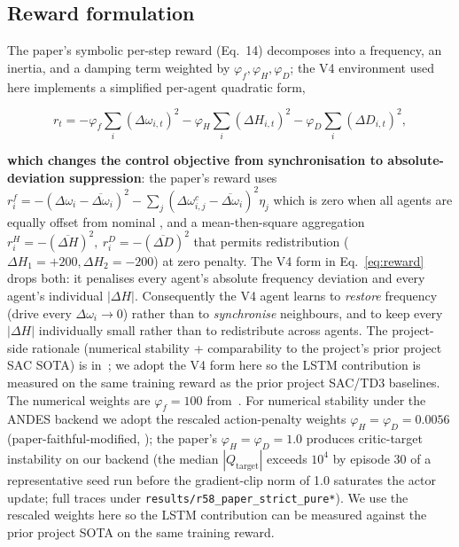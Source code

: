 \documentclass[journal,onecolumn,11pt]{IEEEtran}
\begin{document}
\subsection{Reward formulation}

The paper's symbolic per-step reward (Eq.~14) decomposes into a
frequency, an inertia, and a damping term weighted by
$\varphi_f, \varphi_H, \varphi_D$; the V4 environment used here
implements a simplified per-agent quadratic form,

\begin{equation}\label{eq:reward}
r_t = -\varphi_f \sum_i (\Delta \omega_{i,t})^2
      - \varphi_H \sum_i (\Delta H_{i,t})^2
      - \varphi_D \sum_i (\Delta D_{i,t})^2,
\end{equation}

\textbf{which changes the control objective from synchronisation
to absolute-deviation suppression}: the paper's reward uses
$r^f_i = -(\Delta\omega_i - \overline{\Delta\omega}_i)^2 -
\sum_j (\Delta\omega^c_{i,j} - \overline{\Delta\omega}_i)^2 \eta_j$
which is zero when all agents are equally offset from nominal
\cite[Eq.~15]{yang2023ddic}, and a mean-then-square aggregation
$r^H_i = -(\overline{\Delta H})^2,\ r^D_i = -(\overline{\Delta D})^2$
\cite[Eq.~17--18]{yang2023ddic} that permits redistribution
($\Delta H_1 = +200, \Delta H_2 = -200$) at zero penalty. The V4
form in Eq.~\ref{eq:reward} drops both: it penalises every agent's
absolute frequency deviation and every agent's individual
$|\Delta H|$. Consequently the V4 agent learns to \emph{restore}
frequency (drive every $\Delta\omega_i \to 0$) rather than to
\emph{synchronise} neighbours, and to keep every $|\Delta H|$
individually small rather than to redistribute across agents. The
project-side rationale (numerical stability + comparability to the
project's prior project SAC SOTA) is in~\cite[ADR-0002]{wei2026reproduction};
we adopt the V4 form here so the LSTM contribution is measured on
the same training reward as the prior project SAC/TD3 baselines. The numerical weights are
$\varphi_f = 100$ from~\cite[Sec.~IV-B]{yang2023ddic}. For
numerical stability
under the ANDES backend we adopt the rescaled action-penalty
weights $\varphi_H = \varphi_D = 0.0056$ (paper-faithful-modified,
\cite[ADR-0002]{wei2026reproduction}); the paper's
$\varphi_H = \varphi_D = 1.0$ produces critic-target instability on
our backend (the median $|Q_{\text{target}}|$ exceeds $10^4$ by
episode 30 of a representative seed run before the gradient-clip
norm of 1.0 saturates the actor update; full traces under
\texttt{results/r58\_paper\_strict\_pure*}). We use the rescaled
weights here so the LSTM contribution can be measured against the
prior project SOTA on the same training reward.
\end{document}
